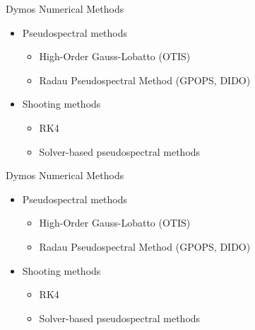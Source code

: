 \documentclass[aspectratio=169, usenames,dvipsnames, 14pt]{beamer}
\begin{document}
\begin{frame}{Dymos Numerical Methods}
    \begin{itemize}
	  	\item Pseudospectral methods
		\vspace{0.25cm}
		    \begin{itemize}
		      \item High-Order Gauss-Lobatto (OTIS)
    		  \vspace{0.25cm}
		      \item Radau Pseudospectral Method (GPOPS, DIDO)
		    \end{itemize}
        \vspace{0.25cm}
        \item Shooting methods
        \vspace{0.25cm}
        	\begin{itemize}
        	  \item RK4
	          \vspace{0.25cm}
	          \item Solver-based pseudospectral methods
	        \end{itemize}
    \end{itemize}
\end{frame}


\begin{frame}{Dymos Numerical Methods}
    \begin{itemize}
	  	\item Pseudospectral methods
		\vspace{0.25cm}
		    \begin{itemize}
		      \item High-Order Gauss-Lobatto (OTIS)
    		  \vspace{0.25cm}
		      \item Radau Pseudospectral Method (GPOPS, DIDO)
		    \end{itemize}
        \vspace{0.25cm}
        \item Shooting methods
        \vspace{0.25cm}
        	\begin{itemize}
        	  \item RK4
	          \vspace{0.25cm}
	          \item Solver-based pseudospectral methods
	        \end{itemize}
    \end{itemize}
\end{frame}
\end{document}
